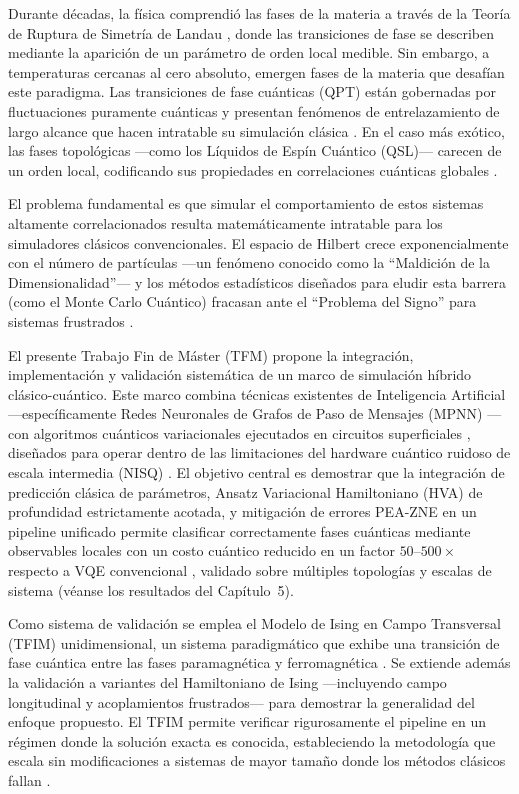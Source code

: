 \documentclass[11pt,a4paper,spanish]{book}
\begin{document}
Durante décadas, la física comprendió las fases de la materia a través de la Teoría de Ruptura de Simetría de Landau \citep{sachdev2011}, donde las transiciones de fase se describen mediante la aparición de un parámetro de orden local medible. Sin embargo, a temperaturas cercanas al cero absoluto, emergen fases de la materia que desafían este paradigma. Las transiciones de fase cuánticas (QPT) están gobernadas por fluctuaciones puramente cuánticas y presentan fenómenos de entrelazamiento de largo alcance que hacen intratable su simulación clásica \citep{dutta2015}. En el caso más exótico, las fases topológicas ---como los Líquidos de Espín Cuántico (QSL)--- carecen de un orden local, codificando sus propiedades en correlaciones cuánticas globales \citep{savary2016}.

El problema fundamental es que simular el comportamiento de estos sistemas altamente correlacionados resulta matemáticamente intratable para los simuladores clásicos convencionales. El espacio de Hilbert crece exponencialmente con el número de partículas ---un fenómeno conocido como la ``Maldición de la Dimensionalidad''--- y los métodos estadísticos diseñados para eludir esta barrera (como el Monte Carlo Cuántico) fracasan ante el ``Problema del Signo'' para sistemas frustrados \citep{troyer2005}.

El presente Trabajo Fin de Máster (TFM) propone la integración, implementación y validación sistemática de un marco de simulación híbrido clásico-cuántico. Este marco combina técnicas existentes de Inteligencia Artificial ---específicamente Redes Neuronales de Grafos de Paso de Mensajes (MPNN) \citep{miao2024, zhang2025}--- con algoritmos cuánticos variacionales ejecutados en circuitos superficiales \citep{wiersema2020}, diseñados para operar dentro de las limitaciones del hardware cuántico ruidoso de escala intermedia (NISQ) \citep{preskill2018}. El objetivo central es demostrar que la integración de predicción clásica de parámetros, Ansatz Variacional Hamiltoniano (HVA) de profundidad estrictamente acotada, y mitigación de errores PEA-ZNE \citep{kim2023} en un pipeline unificado permite clasificar correctamente fases cuánticas mediante observables locales con un costo cuántico reducido en un factor $50$--$500\times$ respecto a VQE convencional \citep{tilly2022}, validado sobre múltiples topologías y escalas de sistema (véanse los resultados del Capítulo~5).

Como sistema de validación se emplea el Modelo de Ising en Campo Transversal (TFIM) unidimensional, un sistema paradigmático que exhibe una transición de fase cuántica entre las fases paramagnética y ferromagnética \citep{dutta2015}. Se extiende además la validación a variantes del Hamiltoniano de Ising ---incluyendo campo longitudinal y acoplamientos frustrados--- para demostrar la generalidad del enfoque propuesto. El TFIM permite verificar rigurosamente el pipeline en un régimen donde la solución exacta es conocida, estableciendo la metodología que escala sin modificaciones a sistemas de mayor tamaño donde los métodos clásicos fallan \citep{tripathi2026}.
\end{document}
